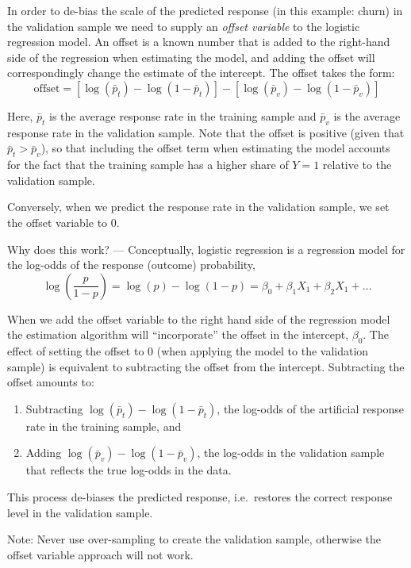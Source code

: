 \documentclass[
]{article}
\begin{document}
In order to de-bias the scale of the predicted response (in this
example: churn) in the validation sample we need to supply an
\emph{offset variable} to the logistic regression model. An offset is a
known number that is added to the right-hand side of the regression when
estimating the model, and adding the offset will correspondingly change
the estimate of the intercept. The offset takes the form:
\[\text{offset}=\left[\log(\bar{p}_{t})-\log(1-\bar{p}_{t})\right]-\left[\log(\bar{p}_{v})-\log(1-\bar{p}_{v})\right]\]

Here, \(\bar{p}_{t}\) is the average response rate in the training
sample and \(\bar{p}_{v}\) is the average response rate in the
validation sample. Note that the offset is positive (given that
\(\bar{p}_t > \bar{p}_v\)), so that including the offset term when
estimating the model accounts for the fact that the training sample has
a higher share of \(Y=1\) relative to the validation sample.

Conversely, when we predict the response rate in the validation sample,
we set the offset variable to 0.

Why does this work? --- Conceptually, logistic regression is a
regression model for the log-odds of the response (outcome) probability,
\[\log \left(\frac{p}{1-p}\right) = \log(p) - \log(1-p) = \beta_0 + \beta_1 X_1 + \beta_2 X_1 + \dots \]

When we add the offset variable to the right hand side of the regression
model the estimation algorithm will ``incorporate'' the offset in the
intercept, \(\beta_0\). The effect of setting the offset to 0 (when
applying the model to the validation sample) is equivalent to
subtracting the offset from the intercept. Subtracting the offset
amounts to:

\begin{enumerate}
\def\labelenumi{(\roman{enumi})}
\item
  Subtracting \(\log(\bar{p}_{t})-\log(1-\bar{p}_{t})\), the log-odds of
  the artificial response rate in the training sample, and
\item
  Adding \(\log(\bar{p}_{v})-\log(1-\bar{p}_{v})\), the log-odds in the
  validation sample that reflects the true log-odds in the data.
\end{enumerate}

This process de-biases the predicted response, i.e.~restores the correct
response level in the validation sample.

Note: Never use over-sampling to create the validation sample, otherwise
the offset variable approach will not work.
\end{document}
